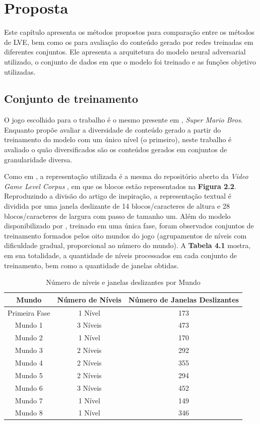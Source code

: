 \chapter{Proposta}

Este capítulo apresenta os métodos propostos para comparação entre os métodos de LVE, bem como os para avaliação do conteúdo gerado por redes treinadas em diferentes conjuntos. Ele apresenta a arquitetura do modelo neural adversarial utilizado, o conjunto de dados em que o modelo foi treinado e as funções objetivo utilizadas.

\section{Conjunto de treinamento}

O jogo escolhido para o trabalho é o mesmo presente em \cite{marioGAN}, \textit{Super Mario Bros}. Enquanto \cite{marioGAN} propõe avaliar a diversidade de conteúdo gerado a partir do treinamento do modelo com um único nível (o primeiro), neste trabalho é avaliado o quão diversificados são os conteúdos gerados em conjuntos de granularidade diversa.

Como em \cite{marioGAN}, a representação utilizada é a mesma do repositório aberto da \textit{Video Game Level Corpus} \cite{VGLC}, em que os blocos estão representados na \textbf{Figura 2.2}. Reproduzindo a divisão do artigo de inspiração, a representação textual é dividida por uma janela deslizante de 14 blocos/caracteres de altura e 28 blocos/caracteres de largura com passo de tamanho um. Além do modelo disponibilizado por \cite{marioGAN}, treinado em uma única fase, foram observados conjuntos de treinamento formados pelos oito mundos do jogo (agrupamentos de níveis com dificuldade gradual, proporcional ao número do mundo). A \textbf{Tabela 4.1} mostra, em sua totalidade, a quantidade de níveis processados em cada conjunto de treinamento, bem como a quantidade de janelas obtidas.

\begin{table}[h]
    \centering
    \begin{tabular}{|c|c|c|}
        \hline
	    Mundo & Número de Níveis & Número de Janelas Deslizantes\\
        \hline
	    Primeira Fase & 1 Nível & 173\\
	    Mundo 1 & 3 Níveis & 473\\
	    Mundo 2 & 1 Nível & 170\\
	    Mundo 3 & 2 Níveis & 292\\
	    Mundo 4 & 2 Níveis & 355\\
	    Mundo 5 & 2 Níveis & 294\\
	    Mundo 6 & 3 Níveis & 452\\
	    Mundo 7 & 1 Nível & 149\\
	    Mundo 8 & 1 Nível & 346\\
        \hline
    \end{tabular}
    \caption{Número de níveis e janelas deslizantes por Mundo}
    \label{tab:niveis}
\end{table}

